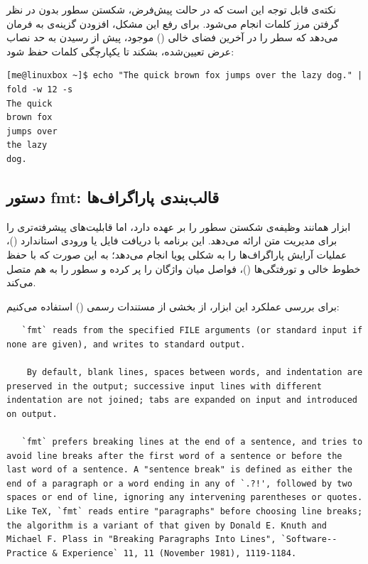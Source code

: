 نکته‌ی قابل توجه این است که در حالت پیش‌فرض، شکستن سطور بدون در نظر گرفتن مرز کلمات انجام می‌شود. برای رفع این مشکل، افزودن گزینه‌ی  به  فرمان می‌دهد که سطر را در آخرین فضای خالی () موجود، پیش از رسیدن به حد نصاب عرض تعیین‌شده، بشکند تا یکپارچگی کلمات حفظ شود:

\begin{latin}
\begin{lstlisting}
[me@linuxbox ~]$ echo "The quick brown fox jumps over the lazy dog." | fold -w 12 -s
The quick
brown fox
jumps over
the lazy
dog.
\end{lstlisting}
\end{latin}

\subsection{دستور fmt: قالب‌بندی پاراگراف‌ها}

ابزار  همانند  وظیفه‌ی شکستن سطور را بر عهده دارد، اما قابلیت‌های پیشرفته‌تری را برای مدیریت متن ارائه می‌دهد. این برنامه با دریافت فایل یا ورودی استاندارد ()، عملیات آرایش پاراگراف‌ها را به شکلی پویا انجام می‌دهد؛ به این صورت که با حفظ خطوط خالی و تورفتگی‌ها ()، فواصل میان واژگان را پر کرده و سطور را به هم متصل می‌کند.

برای بررسی عملکرد این ابزار، از بخشی از مستندات رسمی () استفاده می‌کنیم:

\begin{latin}
\begin{lstlisting}
   `fmt` reads from the specified FILE arguments (or standard input if none are given), and writes to standard output.

    By default, blank lines, spaces between words, and indentation are preserved in the output; successive input lines with different indentation are not joined; tabs are expanded on input and introduced on output.

   `fmt` prefers breaking lines at the end of a sentence, and tries to avoid line breaks after the first word of a sentence or before the last word of a sentence. A "sentence break" is defined as either the end of a paragraph or a word ending in any of `.?!', followed by two spaces or end of line, ignoring any intervening parentheses or quotes. Like TeX, `fmt` reads entire "paragraphs" before choosing line breaks; the algorithm is a variant of that given by Donald E. Knuth and Michael F. Plass in "Breaking Paragraphs Into Lines", `Software--Practice & Experience` 11, 11 (November 1981), 1119-1184.
\end{lstlisting}
\end{latin}

